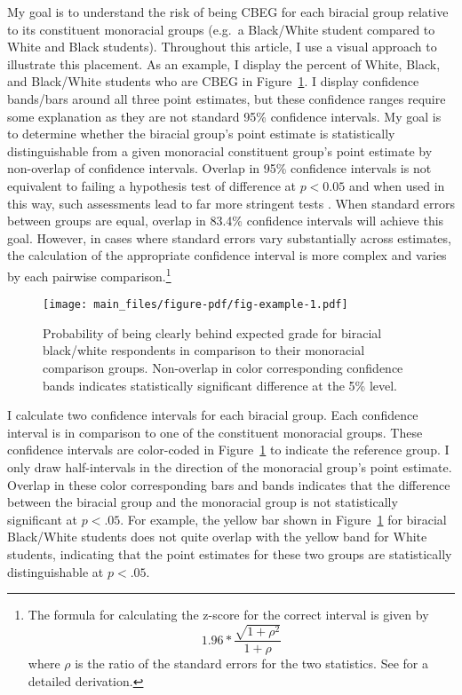 \documentclass[
  12pt,
  letterpaper,
]{article}
\begin{document}
My goal is to understand the risk of being CBEG for each biracial group
relative to its constituent monoracial groups (e.g.~a Black/White
student compared to White and Black students). Throughout this article,
I use a visual approach to illustrate this placement. As an example, I
display the percent of White, Black, and Black/White students who are
CBEG in Figure~\ref{fig-example}. I display confidence bands/bars around
all three point estimates, but these confidence ranges require some
explanation as they are not standard 95\% confidence intervals. My goal
is to determine whether the biracial group's point estimate is
statistically distinguishable from a given monoracial constituent
group's point estimate by non-overlap of confidence intervals. Overlap
in 95\% confidence intervals is not equivalent to failing a hypothesis
test of difference at \(p<0.05\) and when used in this way, such
assessments lead to far more stringent tests \autocite{knol_mis_2011}.
When standard errors between groups are equal, overlap in 83.4\%
confidence intervals will achieve this goal. However, in cases where
standard errors vary substantially across estimates, the calculation of
the appropriate confidence interval is more complex and varies by each
pairwise comparison.\footnote{The formula for calculating the z-score
  for the correct interval is given by
  \[1.96 * \frac{\sqrt{1+\rho^2}}{1+\rho}\] where \(\rho\) is the ratio
  of the standard errors for the two statistics. See
  \textcite{knol_mis_2011} for a detailed derivation.}

\begin{figure}[t]

{\centering \texttt{[image: main\_files/figure-pdf/fig-example-1.pdf]}

}

\caption{\label{fig-example}Probability of being clearly behind expected
grade for biracial black/white respondents in comparison to their
monoracial comparison groups. Non-overlap in color corresponding
confidence bands indicates statistically significant difference at the
5\% level.}

\end{figure}

I calculate two confidence intervals for each biracial group. Each
confidence interval is in comparison to one of the constituent
monoracial groups. These confidence intervals are color-coded in
Figure~\ref{fig-example} to indicate the reference group. I only draw
half-intervals in the direction of the monoracial group's point
estimate. Overlap in these color corresponding bars and bands indicates
that the difference between the biracial group and the monoracial group
is not statistically significant at \(p<.05\). For example, the yellow
bar shown in Figure~\ref{fig-example} for biracial Black/White students
does not quite overlap with the yellow band for White students,
indicating that the point estimates for these two groups are
statistically distinguishable at \(p<.05\).
\end{document}
